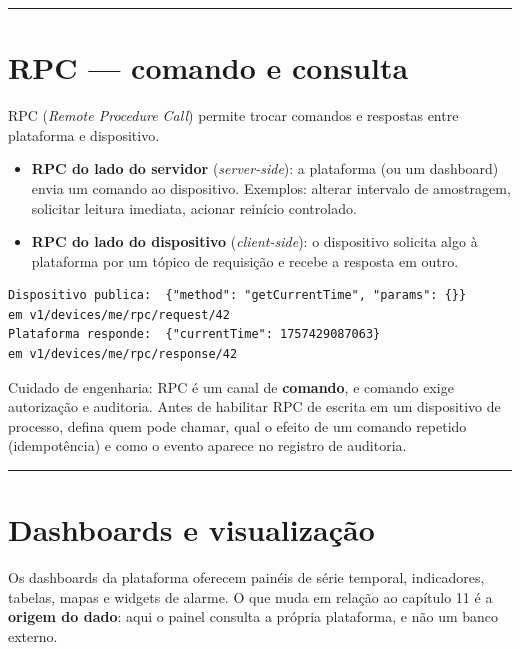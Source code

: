 \begin{center}\rule{0.5\linewidth}{0.5pt}\end{center}

\section{\texorpdfstring{RPC --- comando e consulta}{RPC  comando e consulta}}\label{rpc-comando-e-consulta}

RPC (\emph{Remote Procedure Call}) permite trocar comandos e respostas entre plataforma e dispositivo.

\begin{itemize}
\tightlist
\item
  \textbf{RPC do lado do servidor} (\emph{server-side}): a plataforma (ou um dashboard) envia um comando ao dispositivo. Exemplos: alterar intervalo de amostragem, solicitar leitura imediata, acionar reinício controlado.
\item
  \textbf{RPC do lado do dispositivo} (\emph{client-side}): o dispositivo solicita algo à plataforma por um tópico de requisição e recebe a resposta em outro.
\end{itemize}

\begin{lstlisting}
Dispositivo publica:  {"method": "getCurrentTime", "params": {}}
em v1/devices/me/rpc/request/42
Plataforma responde:  {"currentTime": 1757429087063}
em v1/devices/me/rpc/response/42
\end{lstlisting}

Cuidado de engenharia: RPC é um canal de \textbf{comando}, e comando exige autorização e auditoria. Antes de habilitar RPC de escrita em um dispositivo de processo, defina quem pode chamar, qual o efeito de um comando repetido (idempotência) e como o evento aparece no registro de auditoria.

\begin{center}\rule{0.5\linewidth}{0.5pt}\end{center}

\section{Dashboards e visualização}\label{dashboards-e-visualizauxe7uxe3o}

Os dashboards da plataforma oferecem painéis de série temporal, indicadores, tabelas, mapas e widgets de alarme. O que muda em relação ao capítulo 11 é a \textbf{origem do dado}: aqui o painel consulta a própria plataforma, e não um banco externo.

